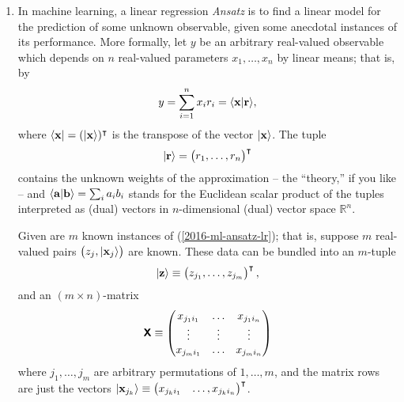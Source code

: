 {\begin{enumerate}
\item
In machine learning, a linear regression {\it Ansatz}\cite{Goodfellow-et-al-2016-Book} is to find a linear model for the prediction of some unknown
observable, given some anecdotal instances of its performance.
More formally, let
$y$ be an arbitrary real-valued observable which depends
on $n$ real-valued parameters $x_1, \ldots , x_n$  by linear means; that is, by
\begin{equation}
y = \sum_{i=1}^n x_i r_i = \langle  {\bf x}\vert {\bf r} \rangle,
\label{2016-ml-ansatz-lr}
\end{equation}
where $\langle {\bf x} \vert = (\vert {\bf x} \rangle )^\intercal $ is the transpose
of the vector $\vert {\bf x} \rangle$.
The tuple
\begin{equation}
\vert {\bf r} \rangle = \begin{pmatrix} r_1, \ldots , r_n \end{pmatrix}^\intercal
\label{2016-ml-ansatz-vectorweights}
\end{equation}
contains the unknown weights of the approximation --
the ``theory,'' if you like --
and $\langle  {\bf a}\vert {\bf b} \rangle = \sum_i a_ib_i$ stands for the Euclidean scalar product of the tuples interpreted
as (dual) vectors in $n$-dimensional (dual) vector space $\mathbb{R}^n$.

Given are $m$ known instances of (\ref{2016-ml-ansatz-lr}); that is, suppose $m$ real-valued pairs
$\begin{pmatrix}z_j, \vert {\bf x}_j \rangle \end{pmatrix}$ are known.
These data can be bundled into an $m$-tuple
\begin{equation}
\vert {\bf z} \rangle \equiv \begin{pmatrix} z_{j_1}, \ldots , z_{j_m} \end{pmatrix}^\intercal ,
\end{equation}
and an $(m \times n)$-matrix
\begin{equation}
\textsf{\textbf{X}} \equiv
\begin{pmatrix}
x_{{j_1}{i_1}} & \ldots & x_{{j_1}{i_n}}\\
\vdots & \vdots & \vdots \\
x_{{j_m}{i_1}} & \ldots & x_{{j_m}{i_n}}
\end{pmatrix}
\end{equation}
where $j_1,\ldots , j_m$ are arbitrary permutations of $1,\ldots ,m$,
and the matrix rows are just the vectors
$\vert {\bf x}_{j_k} \rangle \equiv \begin{pmatrix} x_{{j_k}{i_1}} & \ldots , x_{{j_k}{i_n}} \end{pmatrix}^\intercal $.


\end{enumerate}}
